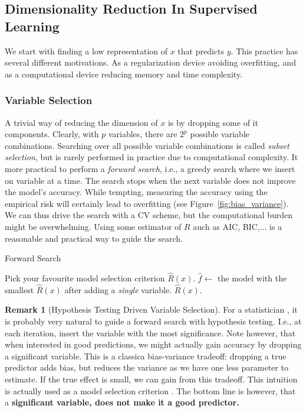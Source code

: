 \documentclass[12pt,a4paper]{article}
\theoremstyle{plain}
\theoremstyle{definition}
\newtheorem{remark}{Remark}
\newcommand{\risk}{R}
\newcommand{\hyp}{f}
\begin{document}
\subsection{Dimensionality Reduction In Supervised Learning}
\label{sec:dim_reduce_supervised}
We start with finding a low representation of $x$ that predicts $y$.
This practice has several different motivations. As a regularization device avoiding overfitting, and  as a computational device reducing memory and time complexity. 

\subsubsection{Variable Selection}
A trivial way of reducing the dimension of $x$ is by dropping some of it components. 
Clearly, with $p$ variables, there are $2^p$ possible variable combinations. Searching over all possible variable combinations is called \emph{subset selection}, but is rarely performed in practice due to computational complexity. It more practical to perform a \emph{forward search}, i.e., a greedy search where we insert on variable at a time.
The search stops when the next variable does not improve the model's accuracy. 
While tempting, measuring the accuracy using the empirical risk will certainly lead to overfitting (see Figure~\ref{fig:bias_variance}).
We can thus drive the search with a CV scheme, but the computational burden might be overwhelming. Using some estimator of $\risk$ auch as AIC, BIC,... is a reasonable and practical way to guide the search.


\begin{algorithm}[H]
\caption{Forward Search}
\begin{algorithmic}
\State Pick your favourite model selection criterion $\hat{\risk}(x)$.
\While{$\hat{\risk}(x)$ keeps getting smaller}
    \State $\hat{\hyp} \gets$ the model with the smallest $\hat{\risk}(x)$ after adding a \emph{single} variable.
\EndWhile
\State \Return $\hat{\risk}(x)$.
\end{algorithmic}
\end{algorithm}



\begin{remark}[Hypothesis Testing Driven Variable Selection]
For a statistician , it is probably very natural to guide a forward search with hypothesis testing. I.e., at each iteration, insert the variable with the most significance. 
Note however, that when interested in good predictions, we might actually gain accuracy by dropping a significant variable. This is a classica bias-variance tradeoff: dropping a true predictor adds bias, but reduces the variance as we have one less parameter to estimate. If the true effect is small, we can gain from this tradeoff. 
This intuition is actually used as a model selection criterion \citep{foster_variable_2004}.
The bottom line is however, that a \textbf{significant variable, does not make it a good predictor.} 
\end{remark}
\end{document}
